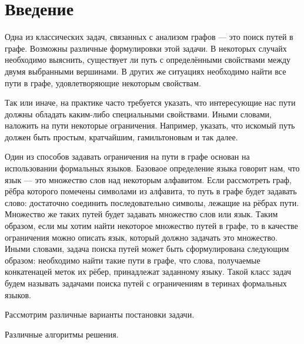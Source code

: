 \section{Введение}


Одна из классических задач, связанных с анализом графов --- это поиск путей в графе.
Возможны различные формулировки этой задачи.
В некоторых случайх необходимо выяснить, существует ли путь с определёнными свойствами между двумя выбранными вершинами.
В других же ситуациях необходимо найти все пути в графе, удовлетворяющие некоторым свойствам.

Так или иначе, на практике часто требуется указать, что интересующие нас пути должны обладать каким-либо специальными свойствами.
Иными словами, наложить на пути некоторые ограничения.
Например, указать, что искомый путь должен быть простым, кратчайшим, гамильтоновым и так далее.

Один из способов задавать ограничения на пути в графе основан на использовании формальных языков.
Базоваое определение языка говорит нам, что язык --- это множество слов над некоторым алфавитом.
Если рассмотреть граф, рёбра которого помечены символами из алфавита, то путь в графе будет задавать слово: достаточно соединить последовательно символы, лежащие на рёбрах пути.
Множество же таких путей будет задавать множество слов или язык.
Таким образом, если мы хотим найти некоторое множество путей в графе, то в качестве ограничения можно описать язык, который должно задачать это множество.
Иными словами, задача поиска путей может быть сформулирована следующим образом: необходимо найти такие пути в графе, что слова, получаемые конкатенацей меток их рёбер, принадлежат заданному языку.
Такой класс задач будем называть задачами поиска путей с ограничениям в теринах формальных языков.

Рассмотрим различные варианты постановки задачи.

Различные алгоритмы решения.
